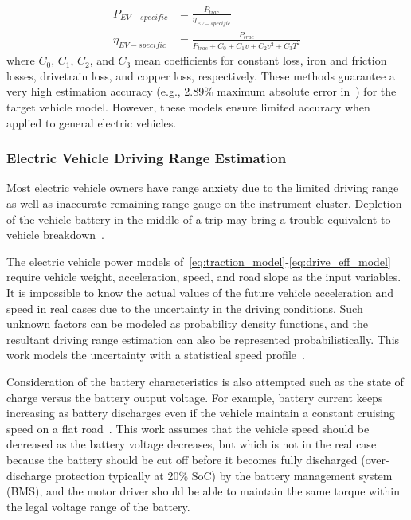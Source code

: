\begin{align} \label{eq:drive_eff_model}
P_{EV-specific} &= \frac{P_{trac}}{\eta_{EV-specific}} \\
\eta_{EV-specific} &= \frac{P_{trac}}{{P_{trac} + C_0 + C_1 v + C_2 v^2 + C_3 T^2}} \nonumber
\end{align}
%
where $C_0$, $C_1$, $C_2$, and $C_3$ mean coefficients for constant loss, iron and friction
losses, drivetrain loss, and copper loss, respectively. These methods guarantee a very high estimation accuracy (e.g., 2.89\% maximum absolute error in~\cite{Hong:ASPDAC16}) for the target vehicle model. However, these models ensure limited accuracy when applied to general electric vehicles.

\subsubsection{Electric Vehicle Driving Range Estimation} \label{subsubsec:range_est}

Most electric vehicle owners have range anxiety due to the limited driving range as well as inaccurate remaining range gauge on the instrument cluster. Depletion of the vehicle battery in the middle of a trip may bring a trouble equivalent to vehicle breakdown~\cite{Hong:ASPDAC16}.

The electric vehicle power models of~\eqref{eq:traction_model}-\eqref{eq:drive_eff_model} require vehicle weight, acceleration, speed, and road slope as the input variables. It is impossible to know the actual values of the future vehicle acceleration and speed in real cases due to the uncertainty in the driving conditions. Such unknown factors can be modeled as probability density functions, and the resultant driving range estimation can also be represented probabilistically. This work models the uncertainty with a statistical speed profile~\cite{Oliva:PHM13}.

Consideration of the battery characteristics is also attempted such as the state of charge versus the battery output voltage. For example, battery current keeps increasing as battery discharges even if the vehicle maintain a constant cruising speed on a flat road~\cite{Vaz:JPS14}. This work assumes that the vehicle speed should be decreased as the battery voltage decreases, but which is not in the real case because the battery should be cut off before it becomes fully discharged (over-discharge protection typically at 20\% SoC) by the battery management system (BMS), and the motor driver should be able to maintain the same torque within the legal voltage range of the battery.

